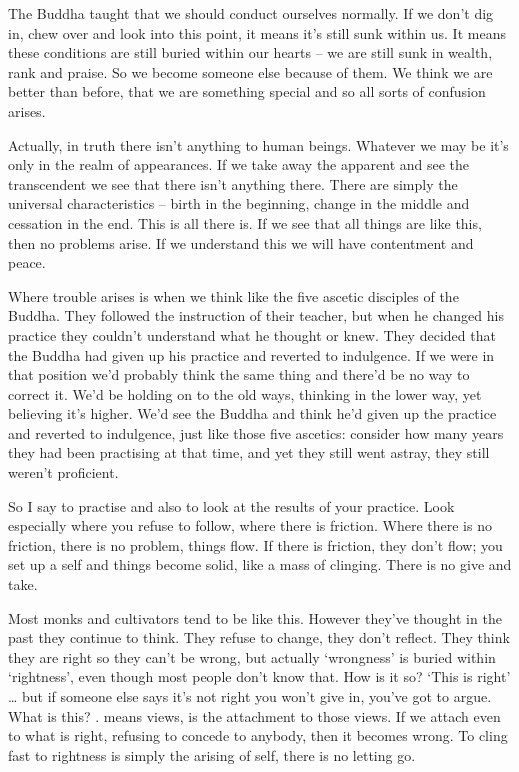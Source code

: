 The Buddha taught that we should conduct ourselves normally. If we don't dig in, chew over and look into this point, it means it's still sunk within us. It means these conditions are still buried within our hearts -- we are still sunk in wealth, rank and praise. So we become someone else because of them. We think we are better than before, that we are something special and so all sorts of confusion arises. 

Actually, in truth there isn't anything to human beings. Whatever we may be it's only in the realm of appearances. If we take away the apparent and see the transcendent we see that there isn't anything there. There are simply the universal characteristics -- birth in the beginning, change in the middle and cessation in the end. This is all there is. If we see that all things are like this, then no problems arise. If we understand this we will have contentment and peace. 

Where trouble arises is when we think like the five ascetic disciples of the Buddha. They followed the instruction of their teacher, but when he changed his practice they couldn't understand what he thought or knew. They decided that the Buddha had given up his practice and reverted to indulgence. If we were in that position we'd probably think the same thing and there'd be no way to correct it. We'd be holding on to the old ways, thinking in the lower way, yet believing it's higher. We'd see the Buddha and think he'd given up the practice and reverted to indulgence, just like those five ascetics: consider how many years they had been practising at that time, and yet they still went astray, they still weren't proficient. 

So I say to practise and also to look at the results of your practice. Look especially where you refuse to follow, where there is friction. Where there is no friction, there is no problem, things flow. If there is friction, they don't flow; you set up a self and things become solid, like a mass of clinging. There is no give and take. 

Most monks and cultivators tend to be like this. However they've thought in the past they continue to think. They refuse to change, they don't reflect. They think they are right so they can't be wrong, but actually `wrongness' is buried within `rightness', even though most people don't know that. How is it so? `This is right' \ldots{} but if someone else says it's not right you won't give in, you've got to argue. What is this? .  means views,  is the attachment to those views. If we attach even to what is right, refusing to concede to anybody, then it becomes wrong. To cling fast to rightness is simply the arising of self, there is no letting go. 

